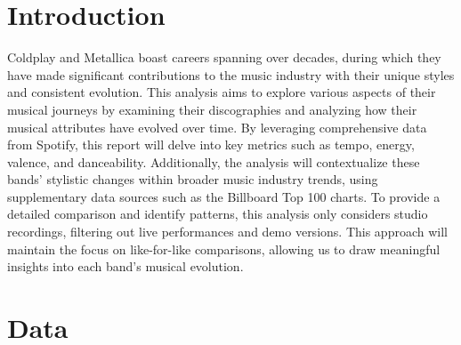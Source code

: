 \documentclass[11pt,preprint, authoryear]{elsarticle}
\numberwithin{equation}{section}
\numberwithin{figure}{section}
\numberwithin{table}{section}
\begin{document}

\headsep 35pt %




\section{\texorpdfstring{Introduction
\label{Introduction}}{Introduction }}\label{introduction}

Coldplay and Metallica boast careers spanning over decades, during which
they have made significant contributions to the music industry with
their unique styles and consistent evolution. This analysis aims to
explore various aspects of their musical journeys by examining their
discographies and analyzing how their musical attributes have evolved
over time. By leveraging comprehensive data from Spotify, this report
will delve into key metrics such as tempo, energy, valence, and
danceability. Additionally, the analysis will contextualize these bands'
stylistic changes within broader music industry trends, using
supplementary data sources such as the Billboard Top 100 charts. To
provide a detailed comparison and identify patterns, this analysis only
considers studio recordings, filtering out live performances and demo
versions. This approach will maintain the focus on like-for-like
comparisons, allowing us to draw meaningful insights into each band's
musical evolution.

\section*{Data}\label{data}
\end{document}
